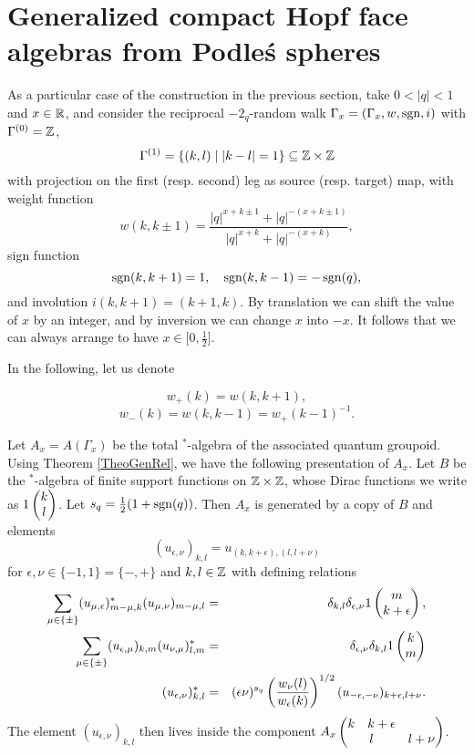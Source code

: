 
\section{Generalized compact Hopf face algebras from Podle\'{s} spheres}

As a particular case of the construction in the previous section, take $0<|q|<1$ and $x\in \mathbb{R}$, and consider the reciprocal $-2_q$-random walk $\Gamma_x =(\Gamma_x,w,\operatorname{\mathrm{sgn}},i)$ with $\Gamma^{(0)} = \mathbb{Z}$, \[\Gamma^{(1)} = \{(k,l)\mid |k-l|= 1\}\subseteq \mathbb{Z}\times \mathbb{Z}\] with projection on the first (resp. second) leg as source (resp. target) map, with weight function \[w(k,k\pm 1) = \frac{|q|^{x+k\pm 1}+|q|^{-(x+k\pm 1)}}{|q|^{x+k}+|q|^{-(x+k)}},\] sign function \[\operatorname{\mathrm{sgn}}(k,k+1) = 1,\quad \operatorname{\mathrm{sgn}}(k,k-1) = -\operatorname{\mathrm{sgn}}(q),\] and involution $i(k,k+1) = (k+1,k)$. By translation we can shift the value of $x$ by an integer, and by inversion we can change $x$ into $-x$. It follows that we can always arrange to have $x\in \lbrack 0,\frac{1}{2}\rbrack$.

In the following, let us denote

\[w_+(k) = w(k,k+1),\]\[w_-(k)  = w(k,k-1) = w_+(k-1)^{-1}.\] 

Let $A_x = A(\Gamma_x)$ be the total $^*$-algebra of the associated quantum groupoid. Using Theorem \ref{TheoGenRel}, we have the following presentation of $A_x$. Let $B$ be the $^*$-algebra of finite support functions on $\mathbb{Z}\times \mathbb{Z}$, whose Dirac functions we write as $1\begin{pmatrix} k \\ l\end{pmatrix}$. Let $s_q = \frac{1}{2}(1+\operatorname{\mathrm{sgn}}(q))$. Then $A_x$ is generated by a copy of $B$ and elements \[(u_{\epsilon,\nu})_{k,l} = u_{(k,k+\epsilon),(l,l+\nu)}\] for $\epsilon,\nu\in \{-1,1\}=\{-,+\}$ and $k,l\in \mathbb{Z}$ with defining relations \begin{eqnarray*} \sum_{\mu\in \{\pm\}} (u_{\mu,\epsilon})_{m-\mu,k}^* (u_{\mu,\nu})_{m-\mu,l}&=& \delta_{k,l} \delta_{\epsilon,\nu} 1\begin{pmatrix} m \\ k+\epsilon\end{pmatrix},\\ \sum_{\mu\in \{\pm\}} (u_{\epsilon,\mu})_{k,m} (u_{\nu,\mu})_{l,m}^* &=& \delta_{\epsilon,\nu}\delta_{k,l} 1\begin{pmatrix} k \\ m\end{pmatrix}\\ (u_{\epsilon,\nu})_{k,l}^* &=& (\epsilon\nu)^{s_q} \left(\frac{w_{\nu}(l)}{w_{\epsilon}(k)}\right)^{1/2} (u_{-\epsilon,-\nu})_{k+\epsilon,l+\nu}.\end{eqnarray*} The element $(u_{\epsilon,\nu})_{k,l}$ then lives inside the component $A_x\begin{pmatrix}k \quad k+\epsilon\\l&l+\nu\end{pmatrix}$.

